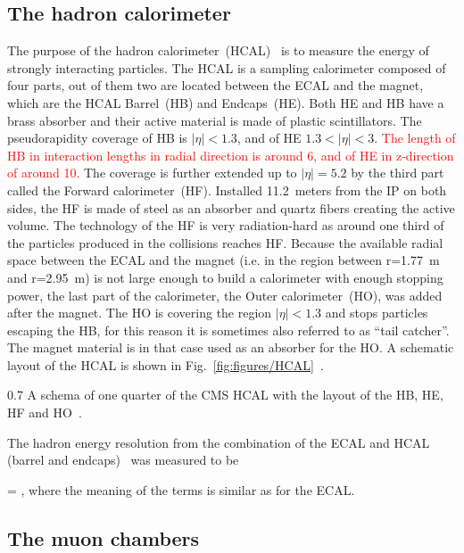 \subsection{The hadron calorimeter}

The purpose of the hadron calorimeter~(HCAL)~\cite{tdrHCAL} is to measure the energy of strongly interacting particles.  The HCAL is a sampling calorimeter composed of four parts, out of them two are located between the ECAL and the magnet, which are the HCAL Barrel~(HB) and Endcaps~(HE). Both HE and HB have a brass absorber and their active material is made of plastic scintillators. The pseudorapidity coverage of HB is $|\eta|<1.3$, and of HE $1.3<|\eta|<3$. \textcolor{red}{The length of HB in interaction lengths in radial direction is around 6, and of HE in z-direction of around 10.} The coverage is further extended up to $|\eta|=5.2$ by the third part called the Forward calorimeter~(HF). Installed 11.2~meters from the IP on both sides, the HF is made of steel as an absorber and quartz fibers creating the active volume. The technology of the HF is very radiation-hard as around one third of the particles produced in the collisions reaches HF. Because the available radial space between the ECAL and the magnet (i.e. in the region between r=1.77~m and r=2.95~m) is not large enough to build a calorimeter with enough stopping power, the last part of the calorimeter, the Outer calorimeter~(HO), was added after the magnet. The HO is covering the region $|\eta|<1.3$ and stops particles escaping the HB, for this reason it is sometimes also referred to as ``tail catcher''. The magnet material is in that case used as an absorber for the HO. A schematic layout of the HCAL is shown in Fig.~\ref{fig:figures/HCAL}~\cite{Chatrchyan:2008aa}.

                 {0.7}       
                 {A schema of one quarter of the CMS HCAL with the layout of the HB, HE, HF and HO~\cite{Chatrchyan:2008aa}. }

The hadron energy resolution from the combination of the ECAL and HCAL (barrel and endcaps)~\cite{Chatrchyan:2009ag} was measured to be


{
  =   ,
}
where the meaning of the terms is similar as for the ECAL.

\subsection{The muon chambers}


